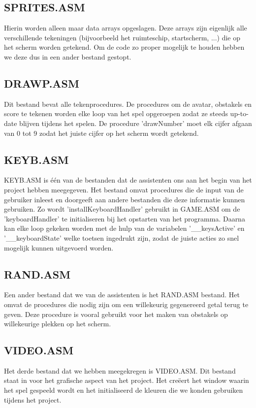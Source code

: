 \documentclass{article}
\begin{document}
\subsection{SPRITES.ASM}\label{sprites_asm}
Hierin worden alleen maar data arrays opgeslagen. Deze arrays zijn eigenlijk alle verschillende tekeningen (bijvoorbeeld het ruimteschip, startscherm, ...) die op het scherm worden getekend. Om de code zo proper mogelijk te houden hebben we deze dus in een ander bestand gestopt.

\subsection{DRAWP.ASM}\label{drawp_asm}
Dit bestand bevat alle tekenprocedures. 
De procedures om de avatar, obstakels en score te tekenen worden elke loop van het spel opgeroepen zodat ze steeds up-to-date blijven tijdens het spelen.
De procedure 'drawNumber' moet elk cijfer afgaan van 0 tot 9 zodat het juiste cijfer op het scherm wordt getekend.

\subsection{KEYB.ASM}\label{keyb_asm}
KEYB.ASM is \'e\'en van de bestanden dat de assistenten ons aan het begin van het project hebben meegegeven.
Het bestand omvat procedures die de input van de gebruiker inleest en doorgeeft aan andere bestanden die deze informatie kunnen gebruiken. Zo wordt 'installKeyboardHandler' gebruikt in 
GAME.ASM om de 'keyboardHandler' te initialiseren bij het opstarten van het programma. Daarna kan elke loop gekeken worden met de hulp van de variabelen '\_\_keysActive' en '\_\_keyboardState' welke toetsen ingedrukt zijn, zodat de juiste acties zo snel mogelijk kunnen uitgevoerd worden.

\subsection{RAND.ASM}\label{rand_asm}
Een ander bestand dat we van de assistenten is het RAND.ASM bestand. Het omvat de procedures die nodig zijn om een willekeurig gegenereerd getal terug te geven. Deze procedure is vooral gebruikt voor het maken van obstakels op willekeurige plekken op het scherm.

\subsection{VIDEO.ASM}\label{video_asm}
Het derde bestand dat we hebben meegekregen is VIDEO.ASM. Dit bestand staat in voor het grafische aspect van het project.
Het cre\"eert het window waarin het spel gespeeld wordt en het initialiseerd de kleuren die we konden gebruiken tijdens het project.
\end{document}
